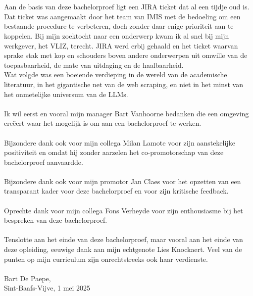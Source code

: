 
\chapter*{}%
\label{ch:voorwoord}


Aan de basis van deze bachelorproef ligt een JIRA ticket dat al een tijdje oud is. Dat ticket was aangemaakt door het team van IMIS met de bedoeling om een bestaande procedure te verbeteren, doch zonder daar enige prioriteit aan te koppelen. Bij mijn zoektocht naar een onderwerp kwam ik al snel bij mijn werkgever, het VLIZ, terecht. JIRA werd erbij gehaald en het ticket waarvan sprake stak met kop en schouders boven andere onderwerpen uit omwille van de toepasbaarheid, de mate van uitdaging en de haalbaarheid.\\
Wat volgde was een boeiende verdieping in de wereld van de academische literatuur, in het gigantische net van de web scraping, en niet in het minst van het onmetelijke universum van de LLMs.\\\\
Ik wil eerst en vooral mijn manager Bart Vanhoorne bedanken die een omgeving creëert waar het mogelijk is om aan een bachelorproef te werken.\\\\
Bijzondere dank ook voor mijn collega Milan Lamote voor zijn aanstekelijke positiviteit en omdat hij zonder aarzelen het co-promotorschap van deze bachelorproef aanvaardde.\\\\
Bijzondere dank ook voor mijn promotor Jan Claes voor het opzetten van een transparant kader voor deze bachelorproef en voor zijn kritische feedback.\\\\
Oprechte dank voor mijn collega Fons Verheyde voor zijn enthousiasme bij het bespreken van deze bachelorproef.\\\\
Tenslotte aan het einde van deze bachelorproef, maar vooral aan het einde van deze opleiding, eeuwige dank aan mijn echtgenote Lies Knockaert. Veel van de punten op mijn curriculum zijn onrechtstreeks ook haar verdienste.
\\\\
Bart De Paepe,\\
Sint-Baafs-Vijve, 1 mei 2025